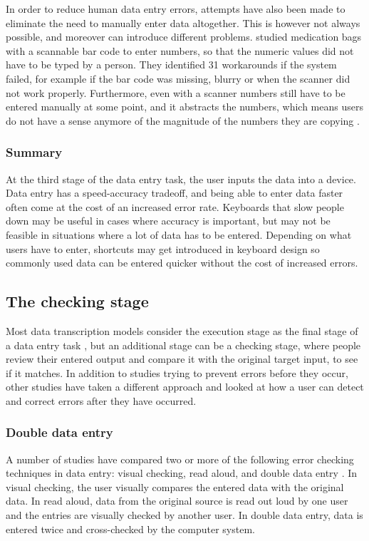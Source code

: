 \documentclass[11pt,oneside]{report}
\begin{document}
In order to reduce human data entry errors, attempts have also been made to eliminate the need to manually enter data altogether. This is however not always possible, and moreover can introduce different problems.
\citet{Koppel2008} studied medication bags with a scannable bar code to enter numbers, so that the numeric values did not have to be typed by a person. They identified 31 workarounds if the system failed, for example if the bar code was missing, blurry or when the scanner did not work properly. Furthermore, even with a scanner numbers still have to be entered manually at some point, and it abstracts the numbers, which means users do not have a sense anymore of the magnitude of the numbers they are copying \citep{Wiseman2013a}. 

\subsubsection{Summary}
At the third stage of the data entry task, the user inputs the data into a device. Data entry has a speed-accuracy tradeoff, and being able to enter data faster often come at the cost of an increased error rate. 
Keyboards that slow people down may be useful in cases where accuracy is important, but may not be feasible in situations where a lot of data has to be entered. Depending on what users have to enter, shortcuts may get introduced in keyboard design so commonly used data can be entered quicker without the cost of increased errors. 

\subsection{The checking stage}
Most data transcription models consider the execution stage as the final stage of a data entry task \citep{Card1983, Salthouse1986}, but an additional stage can be a checking stage, where people review their entered output and compare it with the original target input, to see if it matches. 
In addition to studies trying to prevent errors before they occur, other studies have taken a different approach and looked at how a user can detect and correct errors after they have occurred. 

\subsubsection{Double data entry}
A number of studies have compared two or more of the following error checking techniques in data entry: visual checking, read aloud, and double data entry \citep{Barchard2011, Barchard2013, Kawado2003}. In visual checking, the user visually compares the entered data with the original data. In read aloud, data from the original source is read out loud by one user and the entries are visually checked by another user. In double data entry, data is entered twice and cross-checked by the computer system. 
\end{document}
